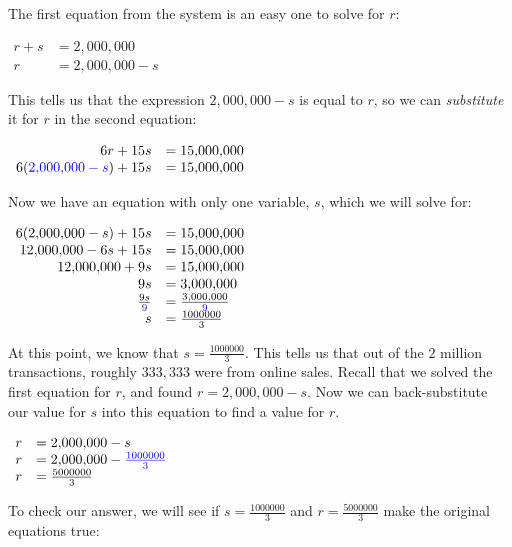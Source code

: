 \documentclass[nooutcomes]{ximera}
\begin{document}
\begin{example}
\begin{explanation}
        The first equation from the system is an easy one to solve for $r$:
\begin{center}
$
\begin{array}{rl}
          r+s &=2{,}000{,}000\\
          r &=2{,}000{,}000-s
\end{array}
$
\end{center}
        This tells us that the expression
        $2{,}000{,}000-s$ is equal to $r$,
        so we can \textit{substitute} it for $r$ in the second equation:
\begin{center}
        $
\begin{array}{rl}
          6r+15s &=15{,}000{,}000\\
          6({\color{blue}{{2{,}000{,}000-s}}})+15s &=15{,}000{,}000
\end{array}
$
\end{center}
          Now we have an equation with only one variable, $s$, which we will solve for:
\begin{center}
$
\begin{array}{rl}
          6(2{,}000{,}000-s)+15s &=15{,}000{,}000\\
          12{,}000{,}000-6s+15s &=15{,}000{,}000\\
          12{,}000{,}000+9s &= 15{,}000{,}000\\
              9s &= 3{,}000{,}000\\
          \frac{9s}{{\color{blue}{{9}}}} &= \frac{3{,}000{,}000}{{\color{blue}{{9}}}}\\
          s &= \frac{1000000}{3}
\end{array}
$
\end{center}
        At this point, we know that $s=\frac{1000000}{3}$.
        This tells us that out of the $2$ million transactions,
        roughly $333{,}333$ were from online sales.
        Recall that we solved the first equation for $r$,
        and found $r=2{,}000{,}000-s$. Now we can back-substitute our value for $s$ into this equation to find a value for $r$. 
\begin{center}
$
\begin{array}{rl}
          r &=2{,}000{,}000-s \\
          r &=2{,}000{,}000-{\color{blue}{{\frac{1000000}{3}}}}\\
          r &= \frac{5000000}{3}
\end{array}
$
\end{center}
        To check our answer, we will see if $s=\frac{1000000}{3}$ and
        $r=\frac{5000000}{3}$ make the original equations true:

\end{explanation}
\end{example}
\end{document}
